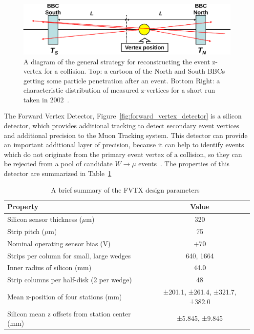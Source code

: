 \begin{figure}[ht]
  \centering
  \includegraphics[width=\linewidth]{./figures/bbc_vertex_reconstruction}
  \caption{
    A diagram of the general strategy for reconstructing the event z-vertex for
    a collision. Top: a cartoon of the North and South BBCs getting some
    particle penetration after an event. Bottom Right: a characteristic
    distribution of measured z-vertices for a short run taken in
    2002~\cite{Nakamura2002}.
  }
  \label{fig:bbc_vertex_reconstruction}
\end{figure}

The Forward Vertex Detector, Figure~\ref{fig:forward_vertex_detector} is a
silicon detector, which provides additional tracking to detect secondary event
vertices and additional precision to the Muon Tracking system. This detector can
provide an important additional layer of precision, because it can help to
identify events which do not originate from the primary event vertex of a
collision, so they can be rejected from a pool of candidate $W\rightarrow\mu$
events~\cite{Aidala2014}. The properties of this detector are summarized in
Table~\ref{tab:fvtx_properties}

\begin{table}[ht]
  \centering
  \begin{tabular}{lc}
    \toprule
    \textbf{Property} & \textbf{Value}\\
    \midrule
    Silicon sensor thickness ($\mu$m) &	320\\
    Strip pitch ($\mu$m) &	75\\
    Nominal operating sensor bias (V)	& +70\\
    Strips per column for small, large wedges	& 640, 1664\\
    Inner radius of silicon (mm) &	44.0\\
    Strip columns per half-disk (2 per wedge) &	48\\
    Mean z-position of four stations (mm)	& ±201.1, ±261.4, ±321.7, ±382.0\\
    Silicon mean z offsets from station center (mm) & 	±5.845, ±9.845\\
    \bottomrule
  \end{tabular}
  \caption{
    A brief summary of the FVTX design parameters~\cite{Aidala2014}
  }
  \label{tab:fvtx_properties}
\end{table}

